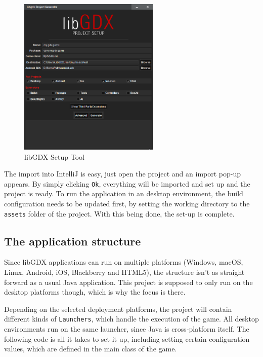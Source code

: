 \documentclass[12p]{article}
\begin{document}
\begin{figure}[ht]
    \centering
    \includegraphics[width=0.6\textwidth]{libGDX_setup.png}
    \caption{libGDX Setup Tool}
    \label{fig:LibGDXSetupScreenshot}
\end{figure}

The import into IntelliJ is easy, just open the project and an import pop-up appears. By simply clicking \texttt{Ok}, everything will be imported and set up and the project is ready. To run the application in an desktop environment, the build configuration needs to be updated first, by setting the working directory to the \texttt{assets} folder of the project. With this being done, the set-up is complete.


\subsection{The application structure}

Since libGDX applications can run on multiple platforms (Windows, macOS, Linux, Android, iOS, Blackberry and HTML5), the structure isn't as straight forward as a usual Java application. This project is supposed to only run on the desktop platforms though, which is why the focus is there.

Depending on the selected deployment platforms, the project will contain different kinds of \texttt{Launchers}, which handle the execution of the game. All desktop environments run on the same launcher, since Java is cross-platform itself. The following code is all it takes to set it up, including setting certain configuration values, which are defined in the main class of the game.
\end{document}
